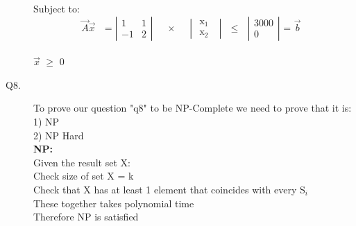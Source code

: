\documentclass[10pt]{csc_assignment}
\begin{document}
\begin{description}
Subject to: \\

\[\text{$\vec{A}$$\vec{x}$ } = \left| \begin{array}{cc}
1 & 1  \\
-1 & 2 \end{array} \right|
\text{~~~ $\times$ ~~~}
\left| \begin{array}{cc}
\text{ x$_{1}$ }  \\
\text{ x$_{2}$ } \end{array} \right|
\text{ $\leqslant$ }
\left| \begin{array}{c}
3000  \\
0 \end{array} \right|
\text{ = $\vec{b}$ }
 \] \\
\hspace*{4.4cm} $\vec{x}$ $\geqslant$ 0\\




\newpage
\item[Q8.]
To prove our question "q8" to be NP-Complete we need to prove that it is:\\
1) NP\\
2) NP Hard\\

\textbf{NP:}\\ 
Given the result set X: \\
Check size of set X  = k \\
Check that X has at least 1 element that coincides with every S$_{i}$ \\
These together takes polynomial time\\
Therefore NP is satisfied\\


\end{description}
\end{document}
